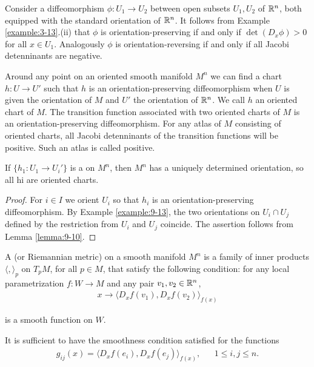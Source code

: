 \begin{example}\label{example:9-13}
  Consider a diffeomorphism $\phi:U_1\to U_2$ between open subsets
$U_1, U_2$ of $\mathbb{R}^n$, both equipped with the standard orientation of $\mathbb{R}^n$. It 
follows from Example \ref{example:3-13}.(ii) that $\phi$ is orientation-preserving if and only if $\det(D_x\phi) > 0$
for all $x\in U_1$. Analogously $\phi$ is orientation-reversing if and only if all Jacobi
detenninants are negative.
\end{example}

Around any point on an oriented smooth manifold $M^n$ we can find a chart
$h:U\to U'$ such that $h$ is an orientation-preserving diffeomorphism when $U$ is
given the orientation of $M$ and $U'$ the orientation of $\mathbb{R}^n$. We call $h$ an oriented
chart of $M$. The transition function associated with two oriented charts of $M$
is an orientation-preserving diffeomorphism. For any atlas of $M$ consisting of
oriented charts, all Jacobi detenninants of the transition functions will be positive.
Such an atlas is called positive.

\begin{proposition}\label{prop:9-14}
  If $\{h_1:U_1\to U_i'\}$ is a  on $M^n$, then $M^n$ has
a uniquely determined orientation, so all hi are oriented charts.
\end{proposition}

\begin{proof}
  For $i\in I$ we orient $U_i$ so that $h_i$ is an orientation-preserving diffeomorphism. 
  By Example \ref{example:9-13}, the two orientations on $U_i\cap U_j$ defined by the restriction
from $U_i$ and $U_j$ coincide. The assertion follows from Lemma \ref{lemma:9-10}.
\end{proof}

\begin{definition}\label{def:9-15}
  A  (or Riemannian metric) on a smooth manifold $M^n$ is a family of 
  inner products $\langle , \rangle_p$ on $T_pM$, for all $p\in M$, that satisfy the following 
  condition: for any local parametrization $f:W\to M$ and any pair $v_1, v_2\in \mathbb{R}^n$,
  \begin{align*}
    x\to \langle D_xf(v_1), D_xf(v_2) \rangle_{f(x)}
  \end{align*}

  is a smooth function on $W$.
\end{definition}

It is sufficient to have the smoothness condition satisfied for the functions
\begin{align*}
  g_{ij}(x) = \langle D_xf(e_i), D_xf(e_j) \rangle_{f(x)}, && 1\le i, j\le n.
\end{align*}

